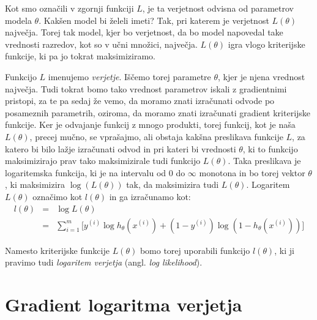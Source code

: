 Kot smo označili v zgornji funkciji $L$, je ta verjetnost odvisna od parametrov modela $\theta$. Kakšen model bi želeli imeti? Tak, pri katerem je verjetnost $L(\theta)$ največja. Torej tak model, kjer bo verjetnost, da bo model napovedal take vrednosti razredov, kot so v učni množici, največja. $L(\theta)$ igra vlogo kriterijske funkcije, ki pa jo tokrat maksimiziramo.

Funkcijo $L$ imenujemo {\em verjetje}. Iščemo torej parametre $\theta$, kjer je njena vrednost največja. Tudi tokrat bomo tako vrednost parametrov iskali z gradientnimi pristopi, za te pa sedaj že vemo, da moramo znati izračunati odvode po posameznih parametrih, oziroma, da moramo znati izračunati gradient kriterijske funkcije. Ker je odvajanje funkcij z mnogo produkti, torej funkcij, kot je naša $L(\theta)$, precej mučno, se vprašajmo, ali obstaja kakšna preslikava funkcije $L$, za katero bi bilo lažje izračunati odvod in pri kateri bi vrednosti $\theta$, ki to funkcijo maksimizirajo prav tako maksimizirale tudi funkcijo $L(\theta)$. Taka preslikava je logaritemska funkcija, ki je na intervalu od 0 do $\infty$ monotona in bo torej vektor $\theta$, ki maksimizira $\log(L(\theta))$ tak, da maksimizira tudi $L(\theta)$. Logaritem $L(\theta)$ označimo kot $l(\theta)$ in ga izračunamo kot:
\begin{eqnarray}
  l(\theta) & = & \log L(\theta) \nonumber\\
  & = & \sum_{i=1}^m\big[y^{(i)}\log h_\theta(x^{(i)})+(1-y^{(i)})\log (1-h_\theta(x^{(i)})) \big]
\end{eqnarray}

Namesto kriterijske funkcije $L(\theta)$ bomo torej uporabili funkcijo $l(\theta)$, ki ji pravimo tudi {\em logaritem verjetja} (angl. {\em log likelihood}).

\section{Gradient logaritma verjetja}

